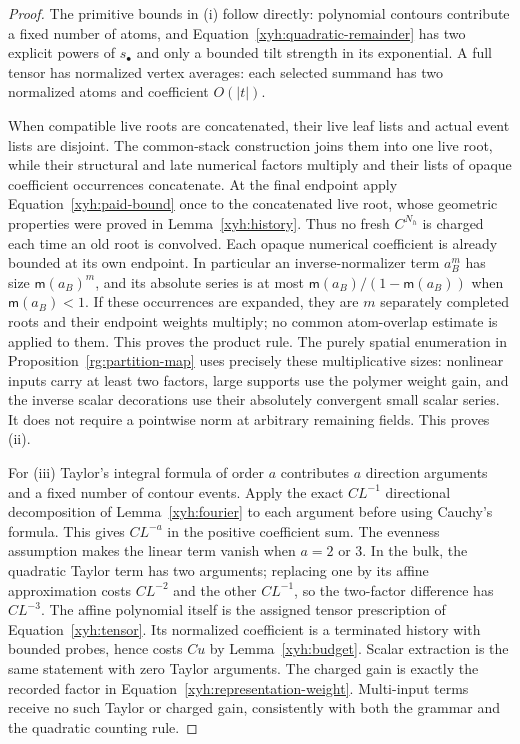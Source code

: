 \begin{proof}
The primitive bounds in (i) follow directly: polynomial
contours contribute a fixed number of atoms, and
Equation~\eqref{xyh:quadratic-remainder} has two explicit powers of
$s_\bullet$ and only a bounded tilt strength in its exponential.
A full tensor has normalized vertex averages: each selected summand
has two normalized atoms and coefficient $O(|t|)$.

When compatible live roots are concatenated, their live leaf lists and
actual event lists are disjoint. The common-stack construction joins them
into one live root, while their structural and late numerical factors
multiply and their lists of opaque coefficient occurrences concatenate.
At the final endpoint apply Equation~\eqref{xyh:paid-bound} once to the
concatenated live root, whose geometric properties were proved in
Lemma~\ref{xyh:history}. Thus no fresh $C^{N_h}$ is charged each time an
old root is convolved. Each opaque numerical coefficient is already
bounded at its own endpoint. In particular an inverse-normalizer term
$a_B^m$ has size $\mathsf m(a_B)^m$, and its absolute series is at most
$\mathsf m(a_B)/(1-\mathsf m(a_B))$ when $\mathsf m(a_B)<1$. If these
occurrences are expanded, they are $m$ separately completed roots and
their endpoint weights multiply; no common atom-overlap estimate is
applied to them.
This proves the product rule. The purely spatial enumeration in
Proposition~\ref{rg:partition-map} uses precisely these multiplicative
sizes: nonlinear inputs carry at least two factors, large supports use
the polymer weight gain, and the inverse scalar decorations use their
absolutely convergent small scalar series. It does not require a
pointwise norm at arbitrary remaining fields. This proves (ii).

For (iii) Taylor's integral formula of order $a$ contributes $a$ direction
arguments and a fixed number of contour events. Apply the exact
$CL^{-1}$ directional decomposition of Lemma~\ref{xyh:fourier} to each
argument before using Cauchy's formula. This gives $CL^{-a}$ in the
positive coefficient sum. The evenness assumption makes the linear
term vanish when $a=2$ or $3$. In the bulk, the quadratic Taylor term
has two arguments; replacing one by its affine approximation costs
$CL^{-2}$ and the other $CL^{-1}$, so the two-factor difference has
$CL^{-3}$. The affine polynomial itself is the assigned tensor
prescription of Equation~\eqref{xyh:tensor}. Its normalized coefficient
is a terminated history with bounded probes, hence costs $Cu$ by
Lemma~\ref{xyh:budget}. Scalar extraction is the same statement with
zero Taylor arguments. The charged gain is exactly the recorded factor
in Equation~\eqref{xyh:representation-weight}. Multi-input terms receive
no such Taylor or charged gain, consistently with both the grammar and
the quadratic counting rule.


\end{proof}
